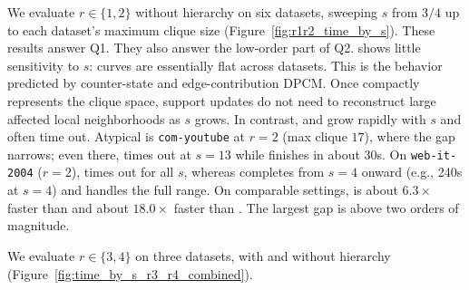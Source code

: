 We evaluate $r\in\{1,2\}$ without hierarchy on six datasets, sweeping $s$ from $3/4$ up to each dataset's maximum clique size (Figure~\ref{fig:r1r2_time_by_s}).
%
These results answer Q1.
%
They also answer the low-order part of Q2.
%
\cbnd shows little sensitivity to $s$: curves are essentially flat across datasets.
%
This is the behavior predicted by counter-state and edge-contribution DPCM.
%
Once \cpi compactly represents the clique space, support updates do not need to reconstruct large affected local neighborhoods as $s$ grows.
%
In contrast, \arb and \nucleus grow rapidly with $s$ and often time out.
%
Atypical is \texttt{com-youtube} at $r{=}2$ (max clique $17$), where the gap narrows; even there, \arb times out at $s{=}13$ while \cbnd finishes in about 30s.
%
On \texttt{web-it-2004} ($r{=}2$), \arb times out for all $s$, whereas \cbnd completes from $s{=}4$ onward (e.g., 240s at $s{=}4$) and handles the full range.
%
On comparable settings, \cbnd is about $6.3\times$ faster than \arb and about $18.0\times$ faster than \nucleus.
%
The largest gap is above two orders of magnitude.
% 


We evaluate $r\in\{3,4\}$ on three datasets, with and without hierarchy (Figure~\ref{fig:time_by_s_r3_r4_combined}).

